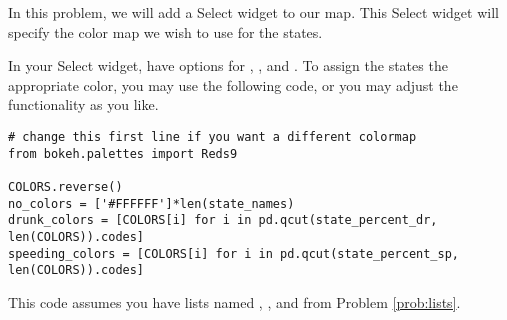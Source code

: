 \begin{problem}
In this problem, we will add a Select widget to our map. This Select widget will
specify the color map we wish to use for the states.

In your Select widget, have options for , , and
. To assign the states the appropriate color, you may use
the following code, or you may adjust the functionality as you like.

\begin{lstlisting}
# change this first line if you want a different colormap
from bokeh.palettes import Reds9

COLORS.reverse()
no_colors = ['#FFFFFF']*len(state_names)
drunk_colors = [COLORS[i] for i in pd.qcut(state_percent_dr, len(COLORS)).codes]
speeding_colors = [COLORS[i] for i in pd.qcut(state_percent_sp, len(COLORS)).codes]
\end{lstlisting}

This code assumes you have lists named , ,
and  from Problem \ref{prob:lists}.

\end{problem}

